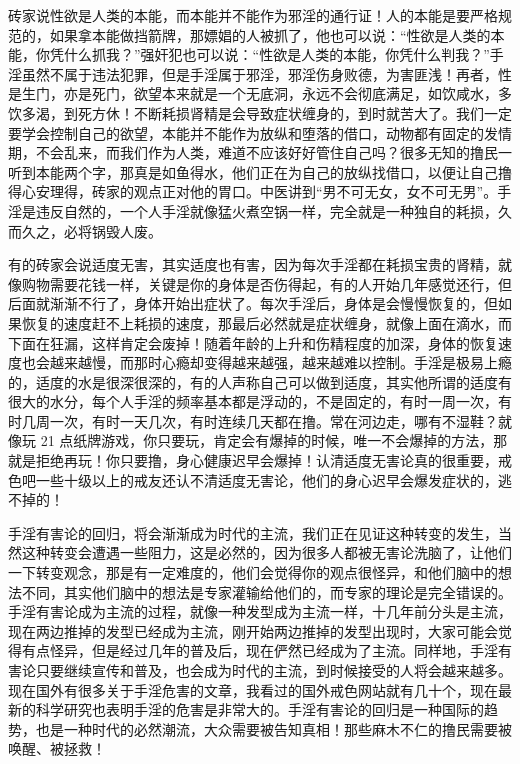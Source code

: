 砖家说性欲是人类的本能，而本能并不能作为邪淫的通行证！人的本能是要严格规范的，如果拿本能做挡箭牌，那嫖娼的人被抓了，他也可以说：“性欲是人类的本能，你凭什么抓我？”强奸犯也可以说：“性欲是人类的本能，你凭什么判我？”手淫虽然不属于违法犯罪，但是手淫属于邪淫，邪淫伤身败德，为害匪浅！再者，性是生门，亦是死门，欲望本来就是一个无底洞，永远不会彻底满足，如饮咸水，多饮多渴，到死方休！不断耗损肾精是会导致症状缠身的，到时就苦大了。我们一定要学会控制自己的欲望，本能并不能作为放纵和堕落的借口，动物都有固定的发情期，不会乱来，而我们作为人类，难道不应该好好管住自己吗？很多无知的撸民一听到本能两个字，那真是如鱼得水，他们正在为自己的放纵找借口，以便让自己撸得心安理得，砖家的观点正对他的胃口。中医讲到“男不可无女，女不可无男”。手淫是违反自然的，一个人手淫就像猛火煮空锅一样，完全就是一种独自的耗损，久而久之，必将锅毁人废。

有的砖家会说适度无害，其实适度也有害，因为每次手淫都在耗损宝贵的肾精，就像购物需要花钱一样，关键是你的身体是否伤得起，有的人开始几年感觉还行，但后面就渐渐不行了，身体开始出症状了。每次手淫后，身体是会慢慢恢复的，但如果恢复的速度赶不上耗损的速度，那最后必然就是症状缠身，就像上面在滴水，而下面在狂漏，这样肯定会废掉！随着年龄的上升和伤精程度的加深，身体的恢复速度也会越来越慢，而那时心瘾却变得越来越强，越来越难以控制。手淫是极易上瘾的，适度的水是很深很深的，有的人声称自己可以做到适度，其实他所谓的适度有很大的水分，每个人手淫的频率基本都是浮动的，不是固定的，有时一周一次，有时几周一次，有时一天几次，有时连续几天都在撸。常在河边走，哪有不湿鞋？就像玩 21 点纸牌游戏，你只要玩，肯定会有爆掉的时候，唯一不会爆掉的方法，那就是拒绝再玩！你只要撸，身心健康迟早会爆掉！认清适度无害论真的很重要，戒色吧一些十级以上的戒友还认不清适度无害论，他们的身心迟早会爆发症状的，逃不掉的！

手淫有害论的回归，将会渐渐成为时代的主流，我们正在见证这种转变的发生，当然这种转变会遭遇一些阻力，这是必然的，因为很多人都被无害论洗脑了，让他们一下转变观念，那是有一定难度的，他们会觉得你的观点很怪异，和他们脑中的想法不同，其实他们脑中的想法是专家灌输给他们的，而专家的理论是完全错误的。手淫有害论成为主流的过程，就像一种发型成为主流一样，十几年前分头是主流，现在两边推掉的发型已经成为主流，刚开始两边推掉的发型出现时，大家可能会觉得有点怪异，但是经过几年的普及后，现在俨然已经成为了主流。同样地，手淫有害论只要继续宣传和普及，也会成为时代的主流，到时候接受的人将会越来越多。现在国外有很多关于手淫危害的文章，我看过的国外戒色网站就有几十个，现在最新的科学研究也表明手淫的危害是非常大的。手淫有害论的回归是一种国际的趋势，也是一种时代的必然潮流，大众需要被告知真相！那些麻木不仁的撸民需要被唤醒、被拯救！

